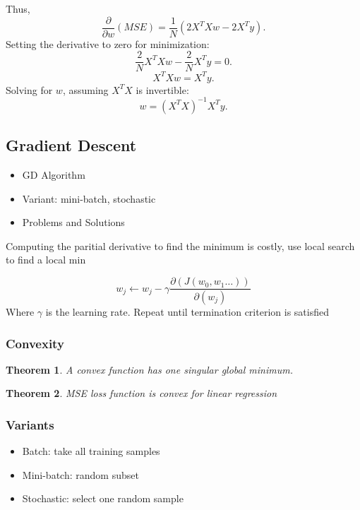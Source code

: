 \documentclass{article}
\newtheorem{theorem}{Theorem}[section]
\begin{document}
Thus,
\begin{equation}
    \frac{\partial}{\partial w} (MSE) = \frac{1}{N} (2X^T X w - 2X^T y).
\end{equation}
Setting the derivative to zero for minimization:
\begin{equation}
    \frac{2}{N} X^T X w - \frac{2}{N} X^T y = 0.
\end{equation}
\begin{equation}
    X^T X w = X^T y.
\end{equation}
Solving for \( w \), assuming \( X^T X \) is invertible:
\begin{equation}
    w = (X^T X)^{-1} X^T y.
\end{equation}

\subsection{Gradient Descent}

\begin{itemize}
    \item GD Algorithm
    \item Variant: mini-batch, stochastic
    \item Problems and Solutions
\end{itemize}



Computing the paritial derivative to find the minimum is costly, use local search to find a local min

\[w_j \leftarrow w_j - \gamma \frac{\partial(J(w_0, w_1\dots))}{\partial(w_j)}\]
Where $\gamma$ is the learning rate. \newline
Repeat until termination criterion is satisfied


\subsubsection*{Convexity}
\begin{theorem}
    A convex function has one singular global minimum.
\end{theorem}

\begin{theorem}
    MSE loss function is convex for linear regression
\end{theorem}

\subsubsection*{Variants}
\begin{itemize}
    \item Batch: take all training samples
    \item Mini-batch: random subset
    \item Stochastic: select one random sample
\end{itemize}
\end{document}
